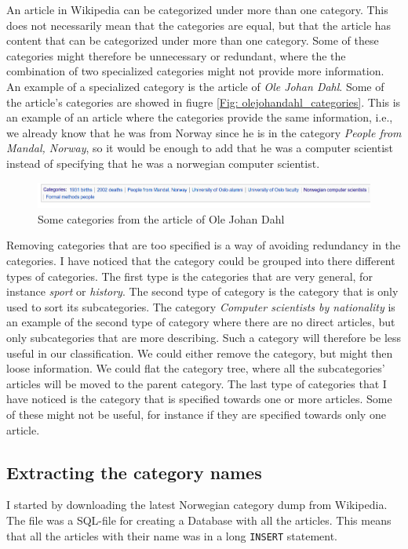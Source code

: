 \documentclass[11pt,english,a4paper]{article}
\begin{document}
An article in Wikipedia can be categorized under more than one category. This does not necessarily mean that the categories are equal, but that the article has content that can be categorized under more than one category. Some of these categories might therefore be unnecessary or redundant, where the the combination of two specialized categories might not provide more information. An example of a specialized category is the article of \textit{Ole Johan Dahl}. Some of the article's categories are showed in fiugre \ref{Fig: olejohandahl_categories}. This is an example of an article where the categories provide the same information, i.e., we already know that he was from Norway since he is in the category \textit{People from Mandal, Norway}, so it would be enough to add that he was a computer scientist instead of specifying that he was a norwegian computer scientist. 

\begin{figure}
\centering
\includegraphics[width=\textwidth]{Dumps/imgs/olejohandahl-categories.png}
\caption{Some categories from the article of Ole Johan Dahl}
\label{fig:olejohandahl_categories}
\end{figure}

Removing categories that are too specified is a way of avoiding redundancy in the categories. I have noticed that the category could be grouped into there different types of categories. The first type is the categories that are very general, for instance \textit{sport} or \textit{history}. The second type of category is the category that is only used to sort its subcategories. The category \textit{Computer scientists by nationality} is an example of the second type of  category where there are no direct articles, but only subcategories that are more describing. Such a category will therefore be less useful in our classification. We could either remove the category, but might then loose information. We could flat the category tree, where all the subcategories' articles will be moved to the parent category. The last type of categories that I have noticed is the category that is specified towards one or more articles. Some of these might not be useful, for instance if they are specified towards only one article. 

\subsection*{Extracting the category names}
I started by downloading the latest Norwegian category dump from Wikipedia. The file was a SQL-file for creating a Database with all the articles. This means that all the articles with their name was in a long \texttt{INSERT} statement. 
\end{document}
